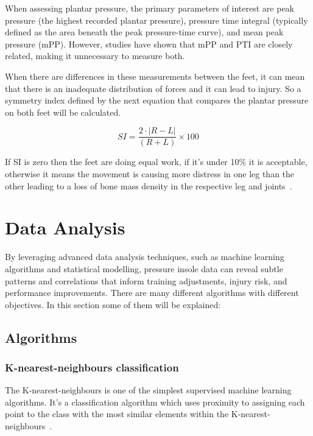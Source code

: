 When assessing plantar pressure, the primary parameters of interest are peak pressure (the highest recorded plantar pressure), pressure time integral (typically defined as the 
area beneath the peak pressure-time curve), and mean peak pressure (mPP). However, studies have shown that mPP and PTI are closely related, making it unnecessary to measure both.

When there are differences in these measurements between the feet, it can mean that there is an inadequate distribution of forces and it can lead to injury. So a symmetry index defined by 
the next equation that compares the plantar pressure on both feet will be calculated.

\begin{equation}
  SI = \frac{2 \cdot \left\lvert R - L\right\rvert }{(R + L)} \times 100
  \label{eq:SIEQ}
\end{equation}


If SI is zero then the feet are doing equal work, if it's under 10\% it is acceptable, otherwise it means the movement is causing more distress in one leg than the other leading to a 
loss of bone mass density in the respective leg and joints~\cite{coimbra}.


\newpage
\section{Data Analysis}
\label{sec:data_analysis}


By leveraging advanced data analysis techniques, such as machine learning algorithms and statistical modelling, pressure insole data can reveal subtle patterns and correlations that 
inform training adjustments, injury risk, and performance improvements. There are many different algorithms with different objectives. In this section some of them will be explained:

\subsection{Algorithms}
\label{ssec:data_algorithm}

\subsubsection{K-nearest-neighbours classification}
\label{sssec:k-nearest_neighbours}

The K-nearest-neighbours is one of the simplest supervised machine learning algorithms. It's a classification algorithm which uses proximity to assigning each point to the class with 
the most similar elements within the K-nearest-neighbours~\cite{bachelorInsole, porto}. 

